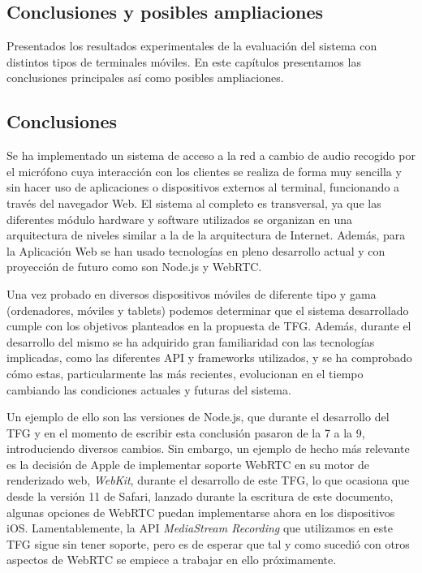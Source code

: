 \clearpage
{}%
\begin{center}
\begin{minipage}{.75\textwidth}
\section{Conclusiones y posibles ampliaciones}

Presentados los resultados experimentales de la evaluación del sistema con distintos tipos de terminales móviles. En este capítulos presentamos las conclusiones principales así como posibles ampliaciones. %
\end{minipage}
\end{center}
\clearpage%

\sloppy
\subsection{Conclusiones}
Se ha implementado un sistema de acceso a la red a cambio de audio recogido por el micrófono cuya interacción con los clientes se realiza de forma muy sencilla y sin hacer uso de aplicaciones o dispositivos externos al terminal, funcionando a través del navegador Web. El sistema al completo es transversal, ya que las diferentes módulo hardware y software utilizados se organizan en una arquitectura de niveles similar a la de la arquitectura de Internet. Además, para la Aplicación Web se han usado tecnologías en pleno desarrollo actual y con proyección de futuro como son Node.js y WebRTC.

Una vez probado en diversos dispositivos móviles de diferente tipo y gama (ordenadores, móviles y tablets) podemos determinar que el sistema desarrollado cumple con los objetivos planteados en la propuesta de TFG. Además, durante el desarrollo del mismo se ha adquirido gran familiaridad con las tecnologías implicadas, como las diferentes API y frameworks utilizados, y se ha comprobado cómo estas, particularmente las más recientes, evolucionan en el tiempo cambiando las condiciones actuales y futuras del sistema.

Un ejemplo de ello son las versiones de Node.js, que durante el desarrollo del TFG y en el momento de escribir esta conclusión pasaron de la 7 a la 9, introduciendo diversos cambios. Sin embargo, un ejemplo de hecho más relevante es la decisión de Apple de implementar soporte WebRTC en su motor de renderizado web, \emph{WebKit}, durante el desarrollo de este TFG, lo que ocasiona que desde la versión 11 de Safari, lanzado durante la escritura de este documento, algunas opciones de WebRTC puedan implementarse ahora en los dispositivos iOS. Lamentablemente, la API \emph{MediaStream Recording} que utilizamos en este TFG sigue sin tener soporte, pero es de esperar que tal y como sucedió con otros aspectos de WebRTC se empiece a trabajar en ello próximamente.

